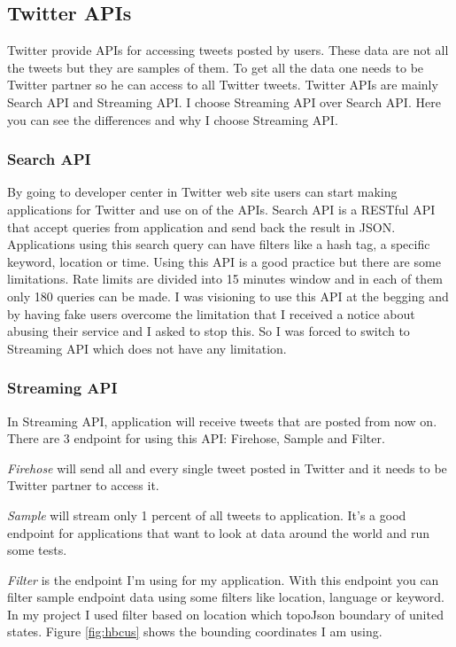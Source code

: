 \documentclass[a4paper,11pt]{report}
\begin{document}
\subsection{Twitter APIs}
Twitter provide APIs for accessing tweets posted by users. These data are not all the tweets but they are samples of them. To get all the data one needs to be Twitter partner so he can access to all Twitter tweets. Twitter APIs are mainly Search API and Streaming API. I choose Streaming API over Search API. Here you can see the differences and why I choose Streaming API.

\subsubsection{Search API}
By going to developer center in Twitter web site users can start making applications for Twitter and use on of the APIs. Search API is a RESTful API that accept queries from application and send back the result in JSON. Applications using this search query can have filters like a hash tag, a specific keyword, location or time. Using this API is a good practice but there are some limitations. Rate limits are divided into 15 minutes window and in each of them only 180 queries can be made. I was visioning to use this API at the begging and by having fake users overcome the limitation that I received a notice about abusing their service and I asked to stop this. So I was forced to switch to Streaming API which does not have any limitation. 

\subsubsection{Streaming API}
In Streaming API, application will receive tweets that are posted from now on. There are 3 endpoint for using this API: Firehose, Sample and Filter.

\emph{Firehose} will send all and every single tweet posted in Twitter and it needs to be Twitter partner to access it.

\emph{Sample} will stream only 1 percent of all tweets to application. It's a good endpoint for applications that want to look at data around the world and run some tests.

\emph{Filter} is the endpoint I'm using for my application. With this endpoint you can filter sample endpoint data using some filters like location, language or keyword. In my project I used filter based on location which topoJson boundary of united states. Figure \ref{fig:hbcus} shows the bounding coordinates I am using.
\end{document}
